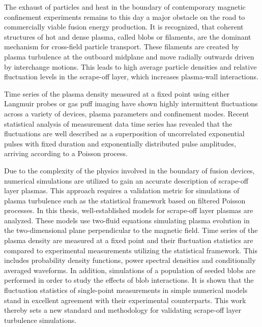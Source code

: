 The exhaust of particles and heat in the boundary of contemporary magnetic confinement experiments remains to this day a major obstacle on the road to
commercially viable fusion energy production. It is recognized, that coherent structures of hot and dense plasma, called blobs or filaments, are the dominant mechanism for cross-field particle transport. These filaments are created by plasma turbulence at the outboard midplane and move radially outwards driven by interchange motions. This leads to high average particle densities and relative fluctuation levels in the scrape-off layer, which increases plasma-wall interactions.

Time series of the plasma density measured at a fixed point using either Langmuir probes or gas puff imaging have shown highly intermittent fluctuations across a variety of devices, plasma parameters and confinement modes. Recent statistical analysis of measurement data time series has revealed that the fluctuations are well described as a superposition of uncorrelated exponential pulses with fixed duration and exponentially distributed pulse amplitudes, arriving according to a Poisson process.  

Due to the complexity of the
physics involved in the boundary of fusion devices, numerical simulations are utilized to gain an accurate description of scrape-off layer plasmas. This approach requires a validation metric for simulations of plasma turbulence such as the statistical framework based on filtered Poisson processes. In this thesis, well-established models for scrape-off layer plasmas are analyzed. These models use two-fluid equations simulating plasma evolution in the two-dimensional plane perpendicular to the magnetic field. Time series of the plasma density are measured at a fixed point and their fluctuation statistics are compared to experimental measurements utilizing the statistical framework. This includes probability density functions, power spectral densities and conditionally averaged waveforms. In addition, simulations of a population of seeded blobs are performed in order to study the effects of blob interactions. It is shown that the fluctuation statistics of single-point measurements in simple numerical models stand in excellent agreement with their experimental counterparts. This work thereby sets a new standard and methodology for validating scrape-off layer turbulence simulations. 





